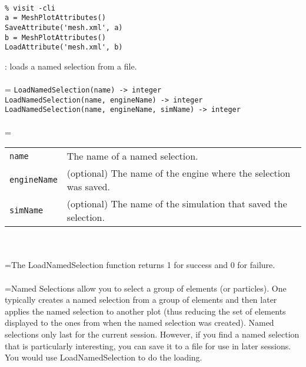 \documentclass[10pt,a4paper]{report}
\begin{document}
\\[-6mm]
\begin{verbatim}% visit -cli
a = MeshPlotAttributes()
SaveAttribute('mesh.xml', a)
b = MeshPlotAttributes()
LoadAttribute('mesh.xml', b)
\end{verbatim}
\newpage


{}
: loads a named selection from a file.\\[-3mm]

 \\ 
\hangindent=\parindent 
\verb!LoadNamedSelection(name) -> integer!\\ 
\verb!LoadNamedSelection(name, engineName) -> integer!\\ 
\verb!LoadNamedSelection(name, engineName, simName) -> integer!\\ [-3mm]

 \\ 
\hangindent=\parindent 
\begin{tabular}{lp{9cm}}
\verb!name! & The name of a named selection. \\
\verb!engineName! & (optional) The name of the engine where the selection was saved. \\
\verb!simName! & (optional) The name of the simulation that saved the selection. \\
\end{tabular} \\[-2mm]


 \\ 
\hangindent=\parindent The LoadNamedSelection function returns 1 for success and 0 for failure. \\[-3mm] 

 \\ 
\hangindent=\parindent Named Selections allow you to select a group of elements (or particles). One typically creates a named selection from a group of elements and then later applies the named selection to another plot (thus reducing the set of elements displayed to the ones from when the named selection was created).  Named selections only last for the current session.  However,  if you find a named selection that is particularly interesting, you can  save it to a file for use in later sessions.  You would use  LoadNamedSelection to do the loading. \\[-3mm] 
\end{document}
